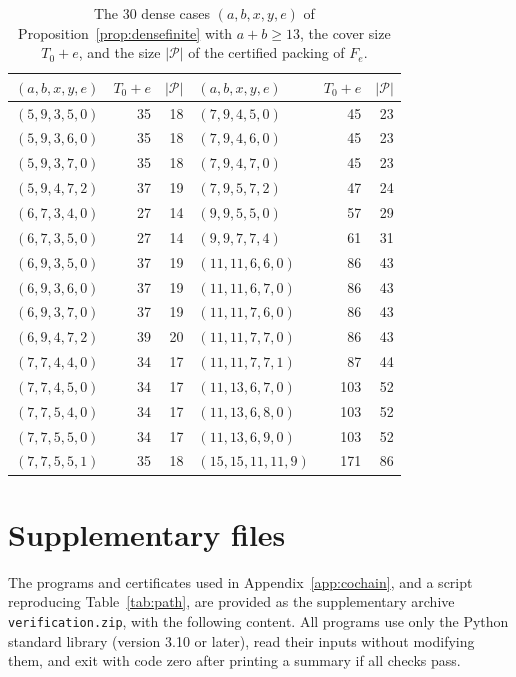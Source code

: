 \documentclass{amsart}
\theoremstyle{definition}
\theoremstyle{remark}
\numberwithin{equation}{section}
\numberwithin{table}{section}
\begin{document}
\begin{table}[p]
\bigskip
\caption{The $30$ dense cases $(a,b,x,y,e)$ of Proposition~\ref{prop:densefinite} with $a+b\ge13$, the cover size $T_0+e$, and the size $|\mathcal P|$ of the certified packing of $F_e$.}\label{tab:densecert}
\begin{tabular}{@{}lrr@{\qquad}lrr@{}}
\toprule
$(a,b,x,y,e)$ & $T_0+e$ & $|\mathcal P|$ & $(a,b,x,y,e)$ & $T_0+e$ & $|\mathcal P|$\\
\midrule
$(5,9,3,5,0)$ & 35 & 18 & $(7,9,4,5,0)$ & 45 & 23 \\
$(5,9,3,6,0)$ & 35 & 18 & $(7,9,4,6,0)$ & 45 & 23 \\
$(5,9,3,7,0)$ & 35 & 18 & $(7,9,4,7,0)$ & 45 & 23 \\
$(5,9,4,7,2)$ & 37 & 19 & $(7,9,5,7,2)$ & 47 & 24 \\
$(6,7,3,4,0)$ & 27 & 14 & $(9,9,5,5,0)$ & 57 & 29 \\
$(6,7,3,5,0)$ & 27 & 14 & $(9,9,7,7,4)$ & 61 & 31 \\
$(6,9,3,5,0)$ & 37 & 19 & $(11,11,6,6,0)$ & 86 & 43 \\
$(6,9,3,6,0)$ & 37 & 19 & $(11,11,6,7,0)$ & 86 & 43 \\
$(6,9,3,7,0)$ & 37 & 19 & $(11,11,7,6,0)$ & 86 & 43 \\
$(6,9,4,7,2)$ & 39 & 20 & $(11,11,7,7,0)$ & 86 & 43 \\
$(7,7,4,4,0)$ & 34 & 17 & $(11,11,7,7,1)$ & 87 & 44 \\
$(7,7,4,5,0)$ & 34 & 17 & $(11,13,6,7,0)$ & 103 & 52 \\
$(7,7,5,4,0)$ & 34 & 17 & $(11,13,6,8,0)$ & 103 & 52 \\
$(7,7,5,5,0)$ & 34 & 17 & $(11,13,6,9,0)$ & 103 & 52 \\
$(7,7,5,5,1)$ & 35 & 18 & $(15,15,11,11,9)$ & 171 & 86 \\
\bottomrule
\end{tabular}
\end{table}

\clearpage
\section{Supplementary files}\label{app:files}

The programs and certificates used in Appendix~\ref{app:cochain}, and a script reproducing Table~\ref{tab:path}, are provided as the supplementary archive \texttt{verification.zip}, with the following content. All programs use only the Python standard library (version 3.10 or later), read their inputs without modifying them, and exit with code zero after printing a summary if all checks pass.
\end{document}
